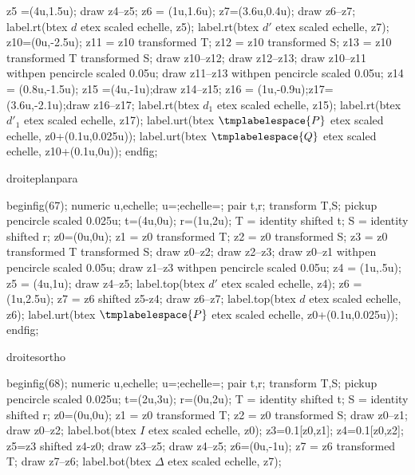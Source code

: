 {{{\begin{mplibcode}[PfLAK]
				z5 =(4u,1.5u);
				draw z4--z5;
				z6 = (1u,1.6u);
				z7=(3.6u,0.4u);
				draw z6--z7;
				label.rt(btex $d$ etex scaled echelle, z5);
				label.rt(btex $d'$ etex scaled echelle, z7);
				z10=(0u,-2.5u);
				z11 = z10 transformed T;
				z12 = z10 transformed S;
				z13 = z10 transformed T transformed S;
				draw z10--z12;
				draw z12--z13;
				draw z10--z11 withpen pencircle scaled 0.05u;
				draw z11--z13 withpen pencircle scaled 0.05u;
				z14 = (0.8u,-1.5u); z15 =(4u,-1u);draw z14--z15;
				z16 = (1u,-0.9u);z17=(3.6u,-2.1u);draw z16--z17;
				label.rt(btex $d_{1}$ etex scaled echelle, z15);
				label.rt(btex $d'_{1}$ etex scaled echelle, z17);
				label.urt(btex $\tmplabelespace{P}$ etex scaled echelle, z0+(0.1u,0.025u));
				label.urt(btex $\tmplabelespace{Q}$ etex scaled echelle, z10+(0.1u,0u));
				endfig;
			\end{mplibcode}
		}%
		{droiteplanpara}{%
			\begin{mplibcode}[PfLAL]
				beginfig(67);
				numeric u,echelle;
				u=\scaleminischemspace*1cm;echelle=\scaleminischemspace;
				pair t,r;
				transform T,S;
				pickup pencircle scaled 0.025u;
				t=(4u,0u); r=(1u,2u);
				T = identity shifted t;
				S = identity shifted r;
				z0=(0u,0u);
				z1 = z0 transformed T;
				z2 = z0 transformed S;
				z3 = z0 transformed T transformed S;
				draw z0--z2;
				draw z2--z3;
				draw z0--z1 withpen pencircle scaled 0.05u;
				draw z1--z3 withpen pencircle scaled 0.05u;
				z4 = (1u,.5u);
				z5 = (4u,1u);
				draw z4--z5;
				label.top(btex $d'$ etex scaled echelle, z4);
				z6 = (1u,2.5u);
				z7 = z6 shifted z5-z4;
				draw z6--z7;
				label.top(btex $d$ etex scaled echelle, z6);
				label.urt(btex $\tmplabelespace{P}$ etex scaled echelle, z0+(0.1u,0.025u));
				endfig;
			\end{mplibcode}
		}%
		{droitesortho}{%
			\begin{mplibcode}[PfLAM]
				beginfig(68);
				numeric u,echelle;
				u=\scaleminischemspace*1cm;echelle=\scaleminischemspace;
				pair t,r;
				transform T,S;
				pickup pencircle scaled 0.025u;
				t=(2u,3u); r=(0u,2u);
				T = identity shifted t;
				S = identity shifted r;
				z0=(0u,0u);
				z1 = z0 transformed T;
				z2 = z0 transformed S;
				draw z0--z1;
				draw z0--z2;
				label.bot(btex $I$ etex scaled echelle, z0);
				z3=0.1[z0,z1];
				z4=0.1[z0,z2];
				z5=z3 shifted z4-z0;
				draw z3--z5;
				draw z4--z5;
				z6=(0u,-1u);
				z7 = z6 transformed T;
				draw z7--z6;
				label.bot(btex $\Delta$ etex scaled echelle, z7);

\end{mplibcode}}}}
